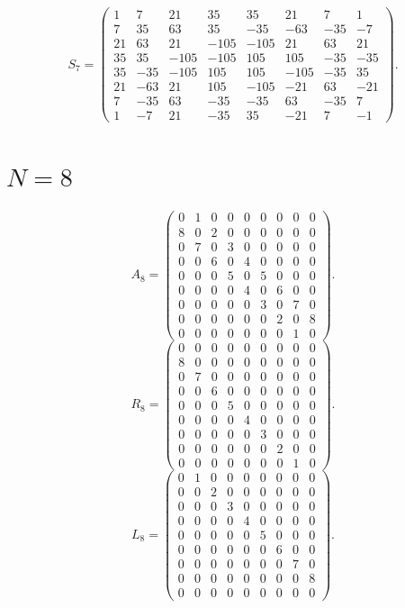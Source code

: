 \documentclass[11pt]{amsart}
\begin{document}
\[
S_{7}=\begin{pmatrix}
1 & 7 & 21 & 35 & 35 & 21 & 7 & 1 \\
7 & 35 & 63 & 35 & -35 & -63 & -35 & -7 \\
21 & 63 & 21 & -105 & -105 & 21 & 63 & 21 \\
35 & 35 & -105 & -105 & 105 & 105 & -35 & -35 \\
35 & -35 & -105 & 105 & 105 & -105 & -35 & 35 \\
21 & -63 & 21 & 105 & -105 & -21 & 63 & -21 \\
7 & -35 & 63 & -35 & -35 & 63 & -35 & 7 \\
1 & -7 & 21 & -35 & 35 & -21 & 7 & -1
\end{pmatrix}.
\]
\section*{$N=8$}
\[
A_{8}=\begin{pmatrix}
0 & 1 & 0 & 0 & 0 & 0 & 0 & 0 & 0 \\
8 & 0 & 2 & 0 & 0 & 0 & 0 & 0 & 0 \\
0 & 7 & 0 & 3 & 0 & 0 & 0 & 0 & 0 \\
0 & 0 & 6 & 0 & 4 & 0 & 0 & 0 & 0 \\
0 & 0 & 0 & 5 & 0 & 5 & 0 & 0 & 0 \\
0 & 0 & 0 & 0 & 4 & 0 & 6 & 0 & 0 \\
0 & 0 & 0 & 0 & 0 & 3 & 0 & 7 & 0 \\
0 & 0 & 0 & 0 & 0 & 0 & 2 & 0 & 8 \\
0 & 0 & 0 & 0 & 0 & 0 & 0 & 1 & 0
\end{pmatrix}.
\]
\[
R_{8}=\begin{pmatrix}
0 & 0 & 0 & 0 & 0 & 0 & 0 & 0 & 0 \\
8 & 0 & 0 & 0 & 0 & 0 & 0 & 0 & 0 \\
0 & 7 & 0 & 0 & 0 & 0 & 0 & 0 & 0 \\
0 & 0 & 6 & 0 & 0 & 0 & 0 & 0 & 0 \\
0 & 0 & 0 & 5 & 0 & 0 & 0 & 0 & 0 \\
0 & 0 & 0 & 0 & 4 & 0 & 0 & 0 & 0 \\
0 & 0 & 0 & 0 & 0 & 3 & 0 & 0 & 0 \\
0 & 0 & 0 & 0 & 0 & 0 & 2 & 0 & 0 \\
0 & 0 & 0 & 0 & 0 & 0 & 0 & 1 & 0
\end{pmatrix}.
\]
\[
L_{8}=\begin{pmatrix}
0 & 1 & 0 & 0 & 0 & 0 & 0 & 0 & 0 \\
0 & 0 & 2 & 0 & 0 & 0 & 0 & 0 & 0 \\
0 & 0 & 0 & 3 & 0 & 0 & 0 & 0 & 0 \\
0 & 0 & 0 & 0 & 4 & 0 & 0 & 0 & 0 \\
0 & 0 & 0 & 0 & 0 & 5 & 0 & 0 & 0 \\
0 & 0 & 0 & 0 & 0 & 0 & 6 & 0 & 0 \\
0 & 0 & 0 & 0 & 0 & 0 & 0 & 7 & 0 \\
0 & 0 & 0 & 0 & 0 & 0 & 0 & 0 & 8 \\
0 & 0 & 0 & 0 & 0 & 0 & 0 & 0 & 0
\end{pmatrix}.
\]
\end{document}
